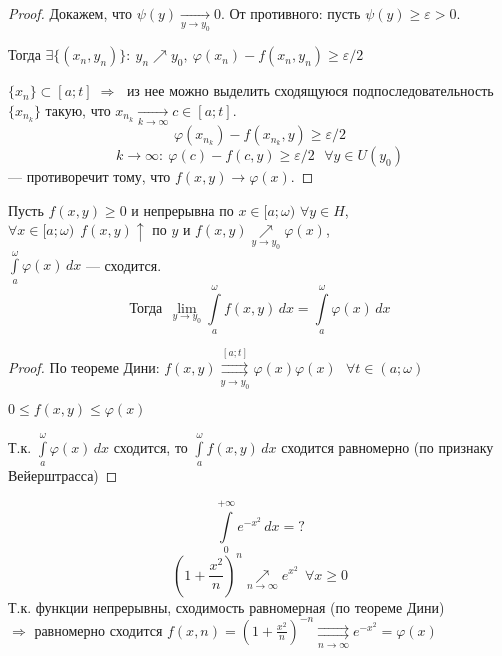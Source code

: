 \begin{properties}
\begin{enumerate}
\begin{proof}
            Докажем, что $\psi(y) \xrightarrow[y \to y_0]{} 0$. От противного: пусть $\psi(y) \ge \varepsilon > 0$.
    
            Тогда $\exists \{ (x_n, y_n) \} : \: y_n \nearrow y_0, \ \varphi(x_n) - f(x_n, y_n) \ge \varepsilon / 2$
            
            $\{ x_n \} \subset [a; t] \;\Rightarrow\;$ из нее можно выделить сходящуюся подпоследовательность $\{ x_{n_k} \}$ такую, что $x_{n_k} \xrightarrow[k \to \infty]{} c \in [a; t]$.
            \[ \varphi(x_{n_k}) - f(x_{n_k}, y) \ge \varepsilon / 2 \]
            \[ k \to \infty: \ \varphi(c) - f(c, y) \ge \varepsilon / 2 \ \ \ \forall y \in U(y_0) \]
            --- противоречит тому, что $f(x, y) \to \varphi(x)$.
        \end{proof}
        \begin{corollary}
            Пусть $f(x, y) \ge 0$ и непрерывна по $x \in [a; \omega)$ $\forall y \in H$, \\
            \phantom{Пусть} $\forall x \in [a; \omega) \ \ f(x, y) \uparrow$ по $y$ и $f(x, y) \underset{y \to y_0}{\nearrow} 
            \varphi(x)$, \\
            \phantom{Пусть} $\int\limits_a^{\omega} \varphi(x)\,dx$ --- сходится.
            \[ \text{Тогда} \ \ \lim_{y \to y_0} \int\limits_a^{\omega} f(x, y)\,dx = \int\limits_a^{\omega} \varphi(x)\,dx \]
        \end{corollary}
        \begin{proof}
            По теореме Дини: $f(x, y) \overset{[a; t]}{\underset{y \to y_0}{\rightrightarrows}} \varphi(x) \varphi(x) \ \ \ 
            \forall t \in (a; \omega)$
            
            $0 \le f(x, y) \le \varphi(x)$
            
            Т.к. $\int\limits_a^{\omega} \varphi(x)\,dx$ сходится, то $\int\limits_a^{\omega} f(x, y)\,dx$ сходится равномерно (по признаку Вейерштрасса) 
        \end{proof}
        
        \begin{example}
            \[ \int\limits_0^{+\infty} e^{-x^2}\,dx = ? \]
            \[ \left( 1 + \frac{x^2}{n} \right)^n \underset{n \to \infty}{\nearrow} e^{x^2} \ \ \forall x \ge 0 \]
            Т.к. функции непрерывны, сходимость равномерная (по теореме Дини) \\
            $\Rightarrow$ равномерно сходится $f(x, n) = \left( 1 + \frac{x^2}{n} \right)^{-n} 
            \underset{n \to \infty}{\rightrightarrows} e^{-x^2} = \varphi(x)$
            

\end{example}
\end{enumerate}
\end{properties}
